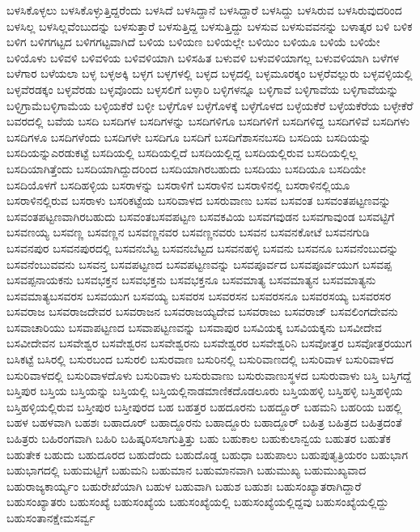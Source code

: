 {ಬಳಸಿಕೊಳ್ಳಲು
ಬಳಸಿಕೊಳ್ಳುತ್ತಿದ್ದರೆಂದು
ಬಳಸಿದೆ
ಬಳಸಿದ್ದಾನೆ
ಬಳಸಿದ್ದಾರೆ
ಬಳಸಿದ್ದು
ಬಳಸಿರುವ
ಬಳಸಿರುವುದರಿಂದ
ಬಳಸಿಲ್ಲ
ಬಳಸಿಲ್ಲವೆಂಬುದನ್ನು
ಬಳಸುತ್ತಾರೆ
ಬಳಸುತ್ತಿದ್ದ
ಬಳಸುತ್ತಿದ್ದು
ಬಳಸುವ
ಬಳಸುವವನನ್ನು
ಬಳಾತ್ಕರ
ಬಳಿ
ಬಳಿಕ
ಬಳಿಗ
ಬಳಿಗಗಟ್ಟದ
ಬಳಿಗಗಟ್ಟವಾಗಿದೆ
ಬಳಿಯ
ಬಳಿಯಣ
ಬಳಿಯಲ್ಲೇ
ಬಳಿಯಿಂ
ಬಳಿಯೂ
ಬಳಿಯೆ
ಬಳಿಯೇ
ಬಳಿಯೊಳು
ಬಳಿವಳಿ
ಬಳಿವಳಿಯ
ಬಳಿವಳಿಯಾಗಿ
ಬಳಿಸಹಿತ
ಬಳುವಳಿ
ಬಳುವಳಿಯಾಗಲ್ಲ
ಬಳುವಳಿಯಾಗಿ
ಬಳೆಗಳ
ಬಳೆಗಾರ
ಬಳೆಯಲಾ
ಬಳ್ಳ
ಬಳ್ಳಅಕ್ಕಿ
ಬಳ್ಳಗ
ಬಳ್ಳಗಳಲ್ಲಿ
ಬಳ್ಳದ
ಬಳ್ಳದಲ್ಲಿ
ಬಳ್ಳಮೂರಕ್ಕಂ
ಬಳ್ಳರೆವಲ್ಲುರು
ಬಳ್ಳವಳ್ಳಿಯಲ್ಲಿ
ಬಳ್ಳವೆರಡಕ್ಕಂ
ಬಳ್ಳವೆರಡು
ಬಳ್ಳವೊಂದು
ಬಳ್ಳಸಲಿಗೆ
ಬಳ್ಳಾರಿ
ಬಳ್ಳಿಗಳನ್ನೂ
ಬಳ್ಳಿಗಾವೆ
ಬಳ್ಳಿಗಾವೆಯ
ಬಳ್ಳಿಗಾವೆಯನ್ನು
ಬಳ್ಳಿಗ್ರಾಮೆಬಳ್ಳಿಗಾಮೆಯ
ಬಳ್ಳಿಯಕೆರೆ
ಬಳ್ಳೀ
ಬಳ್ಳೆಗೊಳ
ಬಳ್ಳೆಗೊಳಕ್ಕೆ
ಬಳ್ಳೆಗೊಳದ
ಬಳ್ಳೆಯಕೆರೆ
ಬಳ್ಳೆಯಕೆರೆಯ
ಬಳ್ಳೇಕೆರೆ
ಬವರದಲ್ಲಿ
ಬವೆಯ
ಬಸದಿ
ಬಸದಿಗಳ
ಬಸದಿಗಳನ್ನು
ಬಸದಿಗಳಿಗೂ
ಬಸದಿಗಳಿಗೆ
ಬಸದಿಗಳಿದ್ದ
ಬಸದಿಗಳಿವೆ
ಬಸದಿಗಳು
ಬಸದಿಗಳೂ
ಬಸದಿಗಳೆಂದು
ಬಸದಿಗಳೇ
ಬಸದಿಗೂ
ಬಸದಿಗೆ
ಬಸದಿಗೆಶಾಸನಬಸದಿ
ಬಸದಿಯ
ಬಸದಿಯನ್ನು
ಬಸದಿಯನ್ನುಎರಡುಕಟ್ಟೆ
ಬಸದಿಯಲ್ಲಿ
ಬಸದಿಯಲ್ಲಿದೆ
ಬಸದಿಯಲ್ಲಿದ್ದ
ಬಸದಿಯಲ್ಲಿರುವ
ಬಸದಿಯಲ್ಲಿಲ್ಲ
ಬಸದಿಯಾಗಿತ್ತೆಂದು
ಬಸದಿಯಾಗಿದ್ದುದರಿಂದ
ಬಸದಿಯಾಗಿರಬಹುದು
ಬಸದಿಯು
ಬಸದಿಯೂ
ಬಸದಿಯೇ
ಬಸದಿಯೊಳಗೆ
ಬಸದಿಹಳ್ಳಿಯ
ಬಸರಾಳನ್ನು
ಬಸರಾಳಿಗೆ
ಬಸರಾಳಿನ
ಬಸರಾಳಿನಲ್ಲಿ
ಬಸರಾಳಿನಲ್ಲಿಯೂ
ಬಸರಾಳಿನಲ್ಲಿರುವ
ಬಸರಾಳು
ಬಸರಿಕಟ್ಟೆಯ
ಬಸರಿವಾಳದ
ಬಸರುವಾಣು
ಬಸವ
ಬಸವಂತ
ಬಸವಂತಪಟ್ಟಣವನ್ನು
ಬಸವಂತಪಟ್ಟಣವಾಗಿರಬಹುದು
ಬಸವಂತಬಸವಪಟ್ಟಣ
ಬಸವಕವಿಯ
ಬಸವಗವುಡನ
ಬಸವಗಾವುಂಡ
ಬಸವಟ್ಟಿಗೆ
ಬಸವಣಯ್ಯ
ಬಸವಣ್ಣ
ಬಸವಣ್ಣನ
ಬಸವಣ್ಣನವರ
ಬಸವಣ್ಣನವರು
ಬಸವನ
ಬಸವನಕೋಟೆ
ಬಸವನಗುಡಿ
ಬಸವನಪುರ
ಬಸವನಪುರದಲ್ಲಿ
ಬಸವನಬೆಟ್ಟ
ಬಸವನಬೆಟ್ಟದ
ಬಸವನಹಳ್ಳಿ
ಬಸವನು
ಬಸವನೂ
ಬಸವನೆಂಬುದನ್ನು
ಬಸವನೆಂಬುವವನು
ಬಸವನ್ತ
ಬಸವಪಟ್ಟಣದ
ಬಸವಪಟ್ಟಣವನ್ನು
ಬಸವಪೂರ್ವದ
ಬಸವಪೂರ್ವಯುಗ
ಬಸವಪ್ಪ
ಬಸವಪ್ಪನಾಯಕನು
ಬಸವಭಕ್ತನ
ಬಸವಭಕ್ತನು
ಬಸವಭಕ್ತನೂ
ಬಸವಮಾತ್ಯ
ಬಸವಮಾತ್ಯನ
ಬಸವಮಾತ್ಯನು
ಬಸವಮಾತ್ಯಬಸವರಸ
ಬಸವಯುಗ
ಬಸವಯ್ಯ
ಬಸವರಸ
ಬಸವರಸನ
ಬಸವರಸನೂ
ಬಸವರಸಯ್ಯ
ಬಸವರಸರ
ಬಸವರಾಜ
ಬಸವರಾಜದೇವರ
ಬಸವರಾಜನ
ಬಸವರಾಜಯ್ಯದೇವ
ಬಸವರಾಜು
ಬಸವರಾಜ್
ಬಸವಲಿಂಗದೇವನು
ಬಸವಾಚಾರಿಯು
ಬಸವಾಪಟ್ಟಣದ
ಬಸವಾಪಟ್ಟಣವನ್ನು
ಬಸವಾಪುರ
ಬಸವಿಯಕ್ಕ
ಬಸವಿಯಕ್ಕನು
ಬಸವೀದೇವ
ಬಸವೀದೇವನ
ಬಸವೇಶ್ವರ
ಬಸವೇಶ್ವರನ
ಬಸವೇಶ್ವರನು
ಬಸವೇಶ್ವರರ
ಬಸವೇಶ್ವರಿನಿ
ಬಸವೋತ್ತರ
ಬಸವೋತ್ತರಯುಗ
ಬಸಿಕಟ್ಟೆ
ಬಸಿರಲ್ಲಿ
ಬಸುರಬಂದ
ಬಸುರಲಿ
ಬಸುರವಾಣ
ಬಸುರಿನಲ್ಲಿ
ಬಸುರಿವಾಣದಲ್ಲಿ
ಬಸುರಿವಾಳ
ಬಸುರಿವಾಳದ
ಬಸುರಿವಾಳದಲ್ಲಿ
ಬಸುರಿವಾಳದೊಳು
ಬಸುರಿವಾಳು
ಬಸುರುವಾಣು
ಬಸುರುವಾಣುಸ್ಥಳದ
ಬಸುರುವಾಳು
ಬಸ್ತಿ
ಬಸ್ತಿಗದ್ದೆ
ಬಸ್ತಿಪುರ
ಬಸ್ತಿಯ
ಬಸ್ತಿಯನ್ನು
ಬಸ್ತಿಯಲ್ಲಿ
ಬಸ್ತಿಯಲ್ಲಿನಾಡಮಾಣಿಕದೊಡಲೂರು
ಬಸ್ತಿಯಹಳ್ಳಿ
ಬಸ್ತಿಹಳ್ಳಿ
ಬಸ್ತಿಹಳ್ಳಿಯ
ಬಸ್ತಿಹಳ್ಳಿಯಲ್ಲಿರುವ
ಬಸ್ತೀಪುರ
ಬಸ್ತೀಪುರದ
ಬಹ
ಬಹತ್ತರ
ಬಹದೂರನು
ಬಹದ್ದೂರ್
ಬಹಮನಿ
ಬಹರಿಯ
ಬಹಲ್ಲಿ
ಬಹಳ
ಬಹಳವಾಗಿ
ಬಹಶಃ
ಬಹಾದೂರ್
ಬಹಾದ್ದೂರನು
ಬಹಾದ್ದೂರು
ಬಹಾದ್ದೂರ್
ಬಹಿತ್ರ
ಬಹಿತ್ರದ
ಬಹಿತ್ರದಂತೆ
ಬಹಿತ್ರರು
ಬಹಿರಂಗವಾಗಿ
ಬಹಿರಿ
ಬಹಿಷ್ಕರಿಸಲಾಗುತ್ತಿತ್ತು
ಬಹು
ಬಹುಕಾಲ
ಬಹುಕುಲಾನ್ವಯ
ಬಹುತರ
ಬಹುತೆಕ
ಬಹುತೇಕ
ಬಹುದು
ಬಹುದೂರದ
ಬಹುದೆಂದು
ಬಹುದೊಡ್ಡ
ಬಹುಧಾ
ಬಹುಪಾಲು
ಬಹುಪುತೃತ್ರಿಯರಂ
ಬಹುಭಾಗ
ಬಹುಭಾಗದಲ್ಲಿ
ಬಹುಮಟ್ಟಿಗೆ
ಬಹುಮನಿ
ಬಹುಮಾನ
ಬಹುಮಾನವಾಗಿ
ಬಹುಮುಖ್ಯ
ಬಹುಮುಖ್ಯವಾದ
ಬಹುರಾಜ್ಯಕಾರ್ಯ್ಯಂ
ಬಹುರೇಖೆಯಾಗಿ
ಬಹುಳ
ಬಹುವಾಗಿ
ಬಹುಶ
ಬಹುಶಃ
ಬಹುಸಂಖ್ಯಾತರಾಗಿದ್ದಾರೆ
ಬಹುಸಂಖ್ಯಾತರು
ಬಹುಸಂಖ್ಯೆ
ಬಹುಸಂಖ್ಯೆಯ
ಬಹುಸಂಖ್ಯೆಯಲ್ಲಿ
ಬಹುಸಂಖ್ಯೆಯಲ್ಲಿದ್ದವು
ಬಹುಸಂಖ್ಯೆಯಲ್ಲಿದ್ದು
ಬಹುಸಂತಾನಕ್ಷೇಮಸರ್ವ್ವ
}
